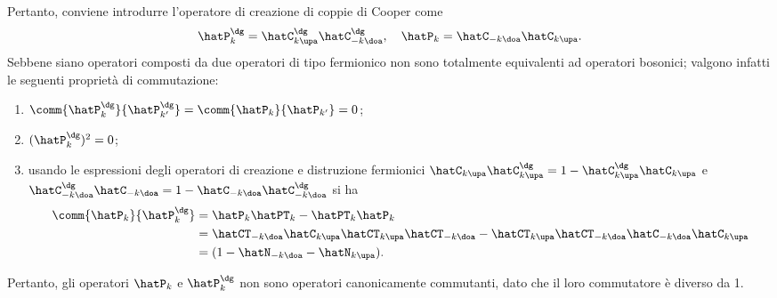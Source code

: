 Pertanto, conviene introdurre l'operatore di creazione di coppie di Cooper come
\begin{equation}
    \hatP^\dg_k = \hatC^\dg_{k\upa}\hatC^\dg_{-k\doa},\quad \hatP_k = \hatC_{-k\doa}\hatC_{k\upa}.
\end{equation}
Sebbene siano operatori composti da due operatori di tipo fermionico non sono totalmente equivalenti
ad operatori bosonici; valgono infatti le seguenti proprietà di commutazione:
\begin{enumerate}
    \item $\comm{\hatP_k^\dg}{\hatP^\dg_{k'}} = \comm{\hatP_k}{\hatP_{k'}} = 0$;
    \item $(\hatP_k^\dg)^2 = 0$;
    \item usando le espressioni degli operatori di creazione e distruzione fermionici $\hatC_{k\upa}\hatC^\dg_{k\upa} = 1 - \hatC_{k\upa}^\dg\hatC_{k\upa}$ e $\hatC^\dg_{-k\doa}\hatC_{-k\doa} = 1 - \hatC_{-k\doa}\hatC^\dg_{-k\doa}$ si ha
    \begin{equation}
        \begin{split}
            \comm{\hatP_k}{\hatP^\dg_k} &= \hatP_k\hatPT_k - \hatPT_k\hatP_k \\
            &= \hatCT_{-k\doa}\hatC_{k\upa}\hatCT_{k\upa}\hatCT_{-k\doa} - \hatCT_{k\upa}\hatCT_{-k\doa}\hatC_{-k\doa}\hatC_{k\upa} \\ 
            &= (1 - \hatN_{-k\doa} - \hatN_{k\upa}).
        \end{split}
    \end{equation}
\end{enumerate}
Pertanto, gli operatori $\hatP_k$ e $\hatP_k^\dg$ non sono operatori canonicamente commutanti, dato che il loro commutatore è diverso da 1.

